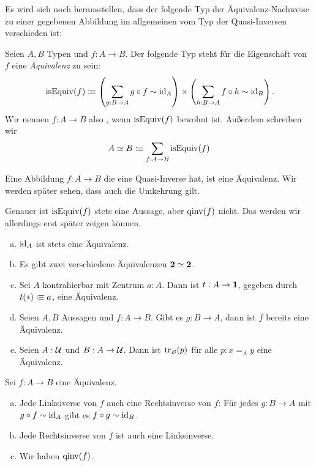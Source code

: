 Es wird sich noch herausstellen, dass der folgende Typ der Äquivalenz-Nachweise zu einer gegebenen Abbildung im allgemeinen vom Typ der Quasi-Inversen verschieden ist:

\begin{definition}
  Seien $A,B$ Typen und $f:A\to B$. Der folgende Typ steht für die Eigenschaft von $f$ eine \emph{Äquivalenz} zu sein:
  \[
    \isEquiv(f) \colonequiv \left(\sum_{g:B\to A} g\circ f\sim\id_A \right)\times \left(\sum_{h:B\to A} f\circ h\sim\id_B\right)\rlap{.}
    \]
    Wir nennen $f:A\to B$ also , wenn $\mathrm{isEquiv}(f)$ bewohnt ist.
    Außerdem schreiben wir
    \[
      A\simeq B\vcentcolon\mspace{-1.2mu}\equiv \sum_{f:A\to B}\mathrm{isEquiv}(f)
    \]
\end{definition}

\begin{bemerkung}
  Eine Abbildung $f:A\to B$ die eine Quasi-Inverse hat, ist eine Äquivalenz.
  Wir werden später sehen, dass auch die Umkehrung gilt.
\end{bemerkung}

Genauer ist $\mathrm{isEquiv}(f)$ stets eine Aussage, aber $\mathrm{qinv}(f)$ nicht.
Das werden wir allerdings erst später zeigen können.

\begin{beispiel}
  \begin{enumerate}[(a)]
  \item $\mathrm{id}_A$ ist stets eine Äquivalenz.
  \item Es gibt zwei verschiedene Äquivalenzen $\mathbf{2}\simeq \mathbf{2}$.
  \item Sei $A$ kontrahierbar mit Zentrum $a:A$.
    Dann ist $t:A\to\mathbf{1}$, gegeben durch $t(\ast)\vcentcolon\mspace{-1.2mu}\equiv a$, eine Äquivalenz.
  \item Seien $A,B$ Aussagen und $f:A\to B$.
    Gibt es $g:B\to A$, dann ist $f$ bereits eine Äquivalenz.
  \item Seien $A:\mathcal{U}$ und $B:A\to\mathcal{U}$. Dann ist $\mathrm{tr}_B(p)$ für alle $p:x=_Ay$ eine Äquivalenz.
  \end{enumerate}
\end{beispiel}

\begin{lemma}
  Sei $f:A\to B$ eine Äquivalenz.
  \begin{enumerate}[(a)]
  \item Jede Linksiverse von $f$ auch eine Rechtsinverse von $f$:
     Für jedes $g:B\to A$ mit $g\circ f \sim \mathrm{id}_A$ gibt es $f\circ g\sim \mathrm{id}_B$.
   \item Jede Rechtsinverse von $f$ ist auch eine Linksinverse.
   \item Wir haben $\mathrm{qinv}(f)$.
  \end{enumerate}
\end{lemma}

